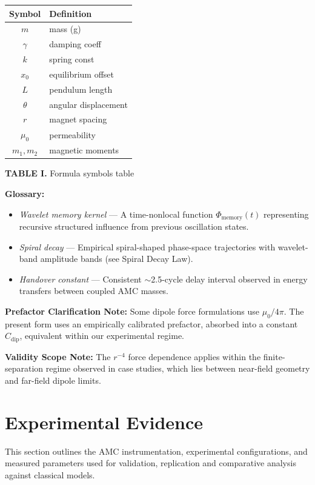 \documentclass[10pt,aps,pre,onecolumn,superscriptaddress,notitlepage]{revtex4-2}
\begin{document}
\begin{center}
\begin{tabular}{|c|l|}
\hline
\textbf{Symbol} & \textbf{Definition} \\ \hline
$m$ & mass (g) \\ \hline
$\gamma$ & damping coeff \\ \hline
$k$ & spring const \\ \hline
$x_0$ & equilibrium offset \\ \hline
$L$ & pendulum length \\ \hline
$\theta$ & angular displacement \\ \hline
$r$ & magnet spacing \\ \hline
$\mu_0$ & permeability \\ \hline
$m_1, m_2$ & magnetic moments \\ \hline
\end{tabular}
\end{center}
\vspace{-1em}
\begin{center}
\textbf{TABLE I.} Formula symbols table
\end{center}


\noindent
\textbf{Glossary:}
\begin{itemize}
  \item \textit{Wavelet memory kernel} — A time-nonlocal function $\Phi_{\text{memory}}(t)$ representing recursive structured influence from previous oscillation states.
  \item \textit{Spiral decay} — Empirical spiral-shaped phase-space trajectories with wavelet-band amplitude bands (see Spiral Decay Law).
  \item \textit{Handover constant} — Consistent $\sim$2.5-cycle delay interval observed in energy transfers between coupled AMC masses.
\end{itemize}

\noindent
\textbf{Prefactor Clarification Note:} Some dipole force formulations use $\mu_0/4\pi$. The present form uses an empirically calibrated prefactor, absorbed into a constant $C_{\text{dip}}$, equivalent within our experimental regime.

\noindent
\textbf{Validity Scope Note:} The $r^{-4}$ force dependence applies within the finite-separation regime observed in case studies, which lies between near-field geometry and far-field dipole limits.

\section{Experimental Evidence}
\label{sec:exp_evidence}
This section outlines the AMC instrumentation, experimental configurations, and measured parameters used for validation, replication and comparative analysis against classical models. 
\end{document}
